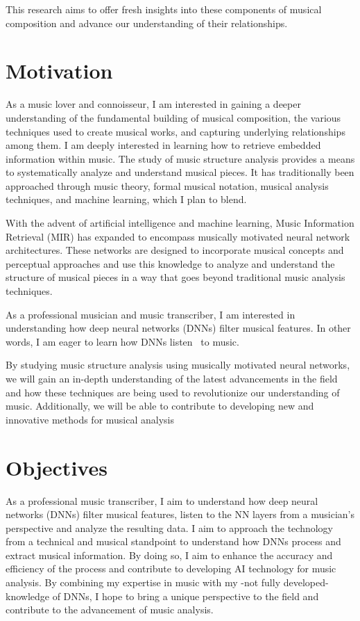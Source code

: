 This research aims to offer fresh insights into these components of musical composition and advance our understanding of their relationships.

\section{Motivation}

As a music lover and connoisseur, I am interested in gaining a deeper understanding of the fundamental building of musical composition, the various techniques used to create musical works, and capturing underlying relationships among them. I am deeply interested in learning how to retrieve embedded information within music. The study of music structure analysis provides a means to systematically analyze and understand musical pieces. It has traditionally been approached through music theory, formal musical notation, musical analysis techniques, and machine learning, which I plan to blend.

With the advent of artificial intelligence and machine learning, Music Information Retrieval (MIR) has expanded to encompass musically motivated neural network architectures. These networks are designed to incorporate musical concepts and perceptual approaches and use this knowledge to analyze and understand the structure of musical pieces in a way that goes beyond traditional music analysis techniques.

As a professional musician and music transcriber, I am interested in understanding how deep neural networks (DNNs) filter musical features. In other words, I am eager to learn how DNNs listen~\cite{7500246} to music.

By studying music structure analysis using musically motivated neural networks, we will gain an in-depth understanding of the latest advancements in the field and how these techniques are being used to revolutionize our understanding of music. Additionally, we will be able to contribute to developing new and innovative methods for musical analysis~\cite{Huang2019MusicTG}

\section{Objectives}

As a professional music transcriber, I aim to understand how deep neural networks (DNNs) filter musical features, listen to the NN layers from a musician's perspective and analyze the resulting data. I aim to approach the technology from a technical and musical standpoint to understand how DNNs process and extract musical information. By doing so, I aim to enhance the accuracy and efficiency of the process and contribute to developing AI technology for music analysis. By combining my expertise in music with my -not fully developed- knowledge of DNNs, I hope to bring a unique perspective to the field and contribute to the advancement of music analysis.

